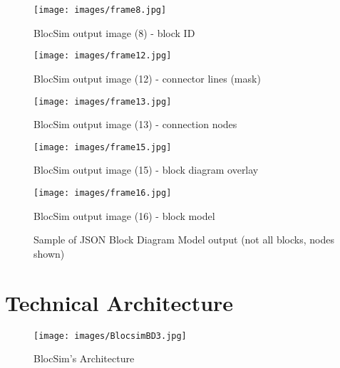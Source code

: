 \begin{figure}[ht!]
\centering
\texttt{[image: images/frame8.jpg]}
\caption{BlocSim output image (8) - block ID \cite{blocsim2014}}
\label{im:frame8}
\end{figure}

\begin{figure}[ht!]
\centering
\texttt{[image: images/frame12.jpg]}
\caption{BlocSim output image (12) - connector lines (mask) \cite{blocsim2014}}
\label{im:frame12}
\end{figure}

\begin{figure}[ht!]
\centering
\texttt{[image: images/frame13.jpg]}
\caption{BlocSim output image (13) - connection nodes \cite{blocsim2014}}
\label{im:frame13}
\end{figure}

\begin{figure}[ht!]
\centering
\texttt{[image: images/frame15.jpg]}
\caption{BlocSim output image (15) - block diagram overlay \cite{blocsim2014}}
\label{im:frame15}
\end{figure}

\begin{figure}[ht!]
\centering
\texttt{[image: images/frame16.jpg]}
\caption{BlocSim output image (16) - block model \cite{blocsim2014}}
\label{im:frame16}
\end{figure}

\clearpage



\newpage
\begin{figure}[ht!]
	\fontsize{8pt}{8pt}
	\singlespacing
	\begin{mdframed}
	\end{mdframed}
	\caption{Sample of JSON Block Diagram Model output (not all blocks, nodes shown)}
	\label{tab:json}
\end{figure}





\section{Technical Architecture}

\begin{figure}[ht!]
\centering
\texttt{[image: images/BlocsimBD3.jpg]}
\caption{BlocSim's Architecture}
\label{im:BlocsimBD3}
\end{figure}

